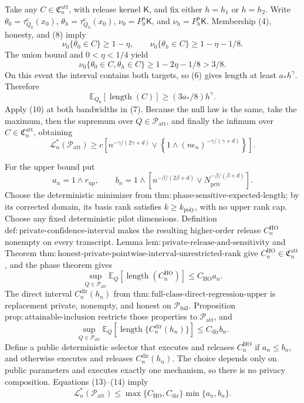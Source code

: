 Take any \(C\in\mathfrak C_n^{\mathrm{att}}\), with release kernel \(\mathsf K\), and fix either \(h=h_1\) or \(h=h_2\).  Write \(\theta_0=\tau_{Q_0}^{\mathrm c}(x_0)\), \(\theta_h=\tau_{Q_h}^{\mathrm c}(x_0)\), \(\nu_0=P_0^n\mathsf K\), and \(\nu_h=P_h^n\mathsf K\).  Membership (4), honesty, and (8) imply
\[
 \nu_0\{\theta_0\in C\}\ge1-\eta,
 \qquad
 \nu_0\{\theta_h\in C\}\ge1-\eta-1/8.
\]
The union bound and \(0<\eta<1/4\) yield
\[
 \nu_0\{\theta_0\in C,\theta_h\in C\}
 \ge1-2\eta-1/8>3/8.
\tag{9}
\]
On this event the interval contains both targets, so (6) gives length at least \(a_*h^\gamma\).  Therefore
\[
 \mathbb E_{Q_0}[\operatorname{length}(C)]\ge(3a_*/8)h^\gamma.
\tag{10}
\]
Apply (10) at both bandwidths in (7).  Because the null law is the same, take the maximum, then the supremum over \(Q\in\mathcal P_{\mathrm{att}}\), and finally the infimum over \(C\in\mathfrak C_n^{\mathrm{att}}\), obtaining
\[
 \mathcal L_n^*(\mathcal P_{\mathrm{att}})
 \ge c\left[n^{-\gamma/(2\gamma+d)}
 \vee\left\{1\wedge(n\epsilon_n)^{-\gamma/(\gamma+d)}\right\}\right].
\tag{11}
\]

For the upper bound put
\[
 a_n=1\wedge r_{\mathrm{up}},
 \qquad
 b_n=1\wedge\left[n^{-\beta/(2\beta+d)}
          \vee N_{\mathrm{priv}}^{-\beta/(\beta+d)}\right].
\tag{12}
\]
Choose the deterministic minimizer from \(\mathrm{thm{:}phase\text{-}sensitive\text{-}expected\text{-}length}\); by its corrected domain, its basis rank satisfies \(k\ge k_{\mathrm{poly}}\), with no upper rank cap.  Choose any fixed deterministic pilot dimensions.  Definition \(\mathrm{def{:}private\text{-}confidence\text{-}interval}\) makes the resulting higher-order release \(C_n^{\mathrm{HO}}\) nonempty on every transcript.  Lemma \(\mathrm{lem{:}private\text{-}release\text{-}and\text{-}sensitivity}\) and Theorem \(\mathrm{thm{:}honest\text{-}private\text{-}pointwise\text{-}interval\text{-}unrestricted\text{-}rank}\) give \(C_n^{\mathrm{HO}}\in\mathfrak C_n^{\mathrm{att}}\), and the phase theorem gives
\[
 \sup_{Q\in\mathcal P_{\mathrm{att}}}
 \mathbb E_Q[\operatorname{length}(C_n^{\mathrm{HO}})]
 \le C_{\mathrm{HO}}a_n.
\tag{13}
\]
The direct interval \(C_n^{\mathrm{dir}}(h_n)\) from \(\mathrm{thm{:}full\text{-}class\text{-}direct\text{-}regression\text{-}upper}\) is replacement private, nonempty, and honest on \(\mathcal P_{\mathrm{full}}\).  Proposition \(\mathrm{prop{:}attainable\text{-}inclusion}\) restricts those properties to \(\mathcal P_{\mathrm{att}}\), and
\[
 \sup_{Q\in\mathcal P_{\mathrm{att}}}
 \mathbb E_Q[\operatorname{length}\{C_n^{\mathrm{dir}}(h_n)\}]
 \le C_{\mathrm{dir}}b_n.
\tag{14}
\]
Define a public deterministic selector that executes and releases \(C_n^{\mathrm{HO}}\) if \(a_n\le b_n\), and otherwise executes and releases \(C_n^{\mathrm{dir}}(h_n)\).  The choice depends only on public parameters and executes exactly one mechanism, so there is no privacy composition.  Equations (13)--(14) imply
\[
 \mathcal L_n^*(\mathcal P_{\mathrm{att}})
 \le\max\{C_{\mathrm{HO}},C_{\mathrm{dir}}\}\min\{a_n,b_n\}.
\tag{15}
\]

